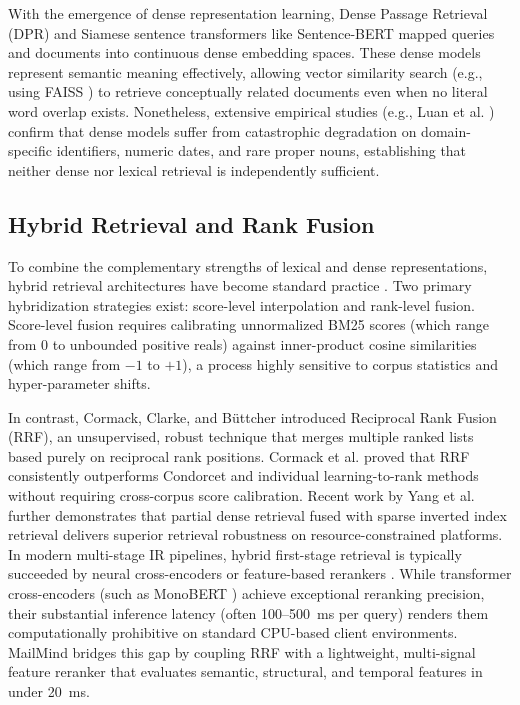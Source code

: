 \documentclass[11pt,a4paper]{article}
\begin{document}
With the emergence of dense representation learning, Dense Passage Retrieval (DPR) \cite{karpukhin2020dense} and Siamese sentence transformers like Sentence-BERT \cite{reimers2019sentence} mapped queries and documents into continuous dense embedding spaces. These dense models represent semantic meaning effectively, allowing vector similarity search (e.g., using FAISS \cite{johnson2021billion}) to retrieve conceptually related documents even when no literal word overlap exists. Nonetheless, extensive empirical studies (e.g., Luan et al. \cite{luan2021sparse}) confirm that dense models suffer from catastrophic degradation on domain-specific identifiers, numeric dates, and rare proper nouns, establishing that neither dense nor lexical retrieval is independently sufficient.

\subsection{Hybrid Retrieval and Rank Fusion}
To combine the complementary strengths of lexical and dense representations, hybrid retrieval architectures have become standard practice \cite{luan2021sparse, formal2021splade, yang2024cluster}. Two primary hybridization strategies exist: score-level interpolation and rank-level fusion. Score-level fusion requires calibrating unnormalized BM25 scores (which range from 0 to unbounded positive reals) against inner-product cosine similarities (which range from $-1$ to $+1$), a process highly sensitive to corpus statistics and hyper-parameter shifts.

In contrast, Cormack, Clarke, and Büttcher \cite{cormack2009reciprocal} introduced Reciprocal Rank Fusion (RRF), an unsupervised, robust technique that merges multiple ranked lists based purely on reciprocal rank positions. Cormack et al. proved that RRF consistently outperforms Condorcet and individual learning-to-rank methods without requiring cross-corpus score calibration. Recent work by Yang et al. \cite{yang2024cluster} further demonstrates that partial dense retrieval fused with sparse inverted index retrieval delivers superior retrieval robustness on resource-constrained platforms. In modern multi-stage IR pipelines, hybrid first-stage retrieval is typically succeeded by neural cross-encoders or feature-based rerankers \cite{nogueira2019passage, khattab2020colbert}. While transformer cross-encoders (such as MonoBERT \cite{nogueira2019passage}) achieve exceptional reranking precision, their substantial inference latency (often 100--500~ms per query) renders them computationally prohibitive on standard CPU-based client environments. MailMind bridges this gap by coupling RRF with a lightweight, multi-signal feature reranker that evaluates semantic, structural, and temporal features in under 20~ms.
\end{document}
